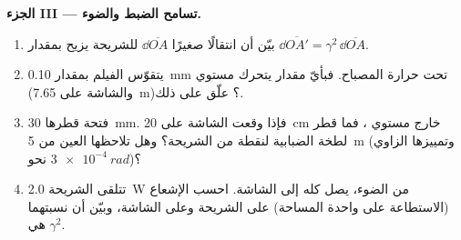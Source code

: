 \begin{problem}
\medskip
\noindent\textbf{الجزء III --- تسامح الضبط والضوء.}
\begin{enumerate}[resume]
  \item بيّن أن انتقالًا صغيرًا $\dd\overline{OA}$ للشريحة
        يزيح  بمقدار $\dd\overline{OA'} = \gamma^2\,\dd\overline{OA}$.
  \item يتقوّس الفيلم بمقدار \qty{0.10}{mm} تحت حرارة المصباح. فبأيّ
        مقدار يتحرك مستوي  (والشاشة على \qty{7.65}{m})؟
        علّق على ذلك.
  \item فتحة  قطرها \qty{30}{mm}. فإذا وقعت الشاشة
        على \qty{20}{cm} خارج مستوي ، فما قطر
        لطخة الضبابية لنقطة من الشريحة؟ وهل تلاحظها العين من \qty{5}{m}
        (وتمييزها الزاوي نحو $\qty{3e-4}{rad}$)؟
  \item تتلقى الشريحة \qty{2.0}{W} من الضوء، يصل كله إلى
        الشاشة. احسب الإشعاع (الاستطاعة على واحدة المساحة) على
        الشريحة وعلى الشاشة، وبيّن أن نسبتهما هي $\gamma^2$.
\end{enumerate}


\end{problem}
